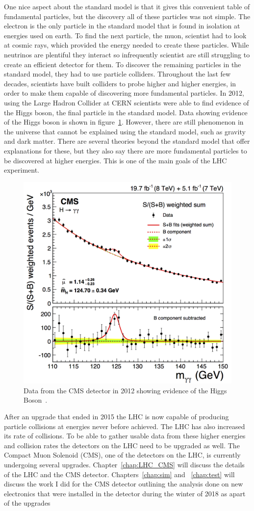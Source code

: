 One nice aspect about the standard model is that it gives this convenient table of fundamental particles, but the discovery all of these particles was not simple. The electron is the only particle in the standard model that is found in isolation at energies used on earth. To find the next particle, the muon, scientist had to look at cosmic rays, which provided the energy needed to create these particles. While neutrinos are plentiful they interact so infrequently scientist are still struggling to create an efficient detector for them. To discover the remaining particles in the standard model, they had to use particle colliders. Throughout the last few decades, scientists have built colliders to probe higher and higher energies, in order to make them capable of discovering more fundamental particles. In 2012, using the Large Hadron Collider at CERN scientists were able to find evidence of the Higgs boson, the final particle in the standard model. Data showing evidence of the Higgs boson is shown in figure~\ref{fig:higgs}. However, there are still phenomenon in the universe that cannot be explained using the standard model, such as gravity and dark matter. There are several theories beyond the standard model that offer explanations for these, but they also say there are more fundamental particles to be discovered at higher energies. This is one of the main goals of the LHC experiment. 

\begin{figure}
\centering
\includegraphics[width=0.6\linewidth]{Figures/higgsmeasurement.png}
\caption{Data from the CMS detector in 2012 showing evidence of the Higgs Boson~\cite{CMS_Higgs_Discovery}.}
\label{fig:higgs}
\end{figure} 


After an upgrade that ended in 2015 the LHC is now capable of producing particle collisions at energies never before achieved. The LHC has also increased its rate of collisions. To be able to gather usable data from these higher energies and collision rates the detectors on the LHC need to be upgraded as well. The Compact Muon Solenoid (CMS), one of the detectors on the LHC, is currently undergoing several upgrades. Chapter~\ref{chap:LHC_CMS} will discuss the details of the LHC and the CMS detector. Chapters~\ref{chap:sim} and ~\ref{chap:test} will discuss the work I did for the CMS detector outlining the analysis done on new electronics that were installed in the detector during the winter of 2018 as apart of the upgrades

